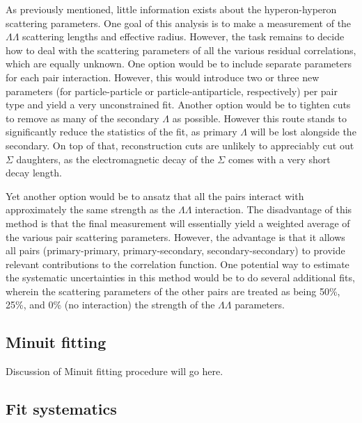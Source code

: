 As previously mentioned, little information exists about the hyperon-hyperon scattering parameters.  One goal of this analysis is to make a measurement of the $\Lambda\Lambda$ scattering lengths and effective radius.  However, the task remains to decide how to deal with the scattering parameters of all the various residual correlations, which are equally unknown.  One option would be to include separate parameters for each pair interaction.  However, this would introduce two or three new parameters (for particle-particle or particle-antiparticle, respectively) per pair type and yield a very unconstrained fit.  Another option would be to tighten cuts to remove as many of the secondary $\Lambda$ as possible.  However this route stands to significantly reduce the statistics of the fit, as primary $\Lambda$ will be lost alongside the secondary.  On top of that, reconstruction cuts are unlikely to appreciably cut out $\Sigma$ daughters, as the electromagnetic decay of the $\Sigma$ comes with a very short decay length.

Yet another option would be to ansatz that all the pairs interact with approximately the same strength as the $\Lambda\Lambda$ interaction.  The disadvantage of this method is that the final measurement will essentially yield a weighted average of the various pair scattering parameters.  However, the advantage is that it allows all pairs (primary-primary, primary-secondary, secondary-secondary) to provide relevant contributions to the correlation function.  One potential way to estimate the systematic uncertainties in this method would be to do several additional fits, wherein the scattering parameters of the other pairs are treated as being 50\%, 25\%, and 0\% (no interaction) the strength of the $\Lambda\Lambda$ parameters.

\subsection{Minuit fitting}
\label{sec:MinuitFit}

Discussion of Minuit fitting procedure will go here.

\subsection{Fit systematics}
\label{sec:FitSystematics}

